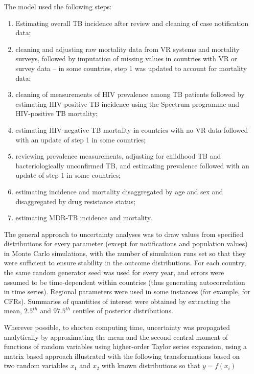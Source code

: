 The model used  the following steps: 

\begin{enumerate}
\item Estimating overall TB incidence after review and cleaning of case notification data;
\item cleaning and adjusting raw mortality data from VR systems and mortality surveys, followed by imputation of missing values in countries with VR or survey data – in some countries, step 1 was updated to account for mortality data;
\item cleaning of measurements of HIV prevalence among TB patients followed by estimating HIV-positive TB incidence using the Spectrum programme and HIV-positive TB mortality;
\item estimating HIV-negative TB mortality in countries with no VR data followed with an update of step 1 in some countries; 
\item reviewing prevalence measurements, adjusting for childhood TB and bacteriologically unconfirmed TB,  and estimating prevalence followed with an update of step 1 in some countries; 
\item estimating incidence and mortality disaggregated by age and sex and disaggregated by drug resistance status;
\item estimating MDR-TB incidence and mortality.
\end{enumerate}

The general approach to uncertainty analyses was to draw values from specified distributions for every parameter (except for notifications and population values) in Monte Carlo simulations, with the number of simulation runs set so that they were sufficient to ensure stability in the outcome distributions. For each country, the same random generator seed was used for every year, and errors were assumed to be time-dependent within countries (thus generating autocorrelation in time series). Regional parameters were used in some instances (for example, for CFRs). Summaries of quantities of interest were obtained by extracting the mean, $2.5^{th}$ and $97.5^{th}$ centiles of posterior distributions. 

Wherever possible, to shorten computing time, uncertainty was propagated analytically by approximating the mean and the second central moment of functions of random variables using higher-order Taylor series expansion\cite{Ku_1966}, using a matrix based approach\cite{Lab1998-dy} illustrated with the following transformations based on two random variables $x_1$ and $x_2$ with known distributions so that $y = f(x_i)$ 


